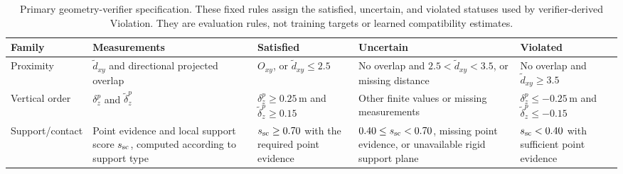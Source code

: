 \begin{table}[t]
\centering
{\small
\setlength{\tabcolsep}{3pt}
\begin{tabularx}{\textwidth}{@{}p{}p{}XXX@{}}
\toprule
Family & Measurements & Satisfied & Uncertain & Violated \\
\midrule
Proximity &
\(\widetilde d_{xy}\) and directional projected overlap &
\(O_{xy}\), or \(\widetilde d_{xy}\leq2.5\) &
No overlap and \(2.5<\widetilde d_{xy}<3.5\), or missing distance &
No overlap and \(\widetilde d_{xy}\geq3.5\) \\
\addlinespace
Vertical order &
\(\delta_z^p\) and \(\widetilde\delta_z^p\) &
\(\delta_z^p\geq0.25\,\mathrm m\) and
\(\widetilde\delta_z^p\geq0.15\) &
Other finite values or missing measurements &
\(\delta_z^p\leq-0.25\,\mathrm m\) and
\(\widetilde\delta_z^p\leq-0.15\) \\
\addlinespace
Support/\allowbreak contact &
Point evidence and local support score \(s_{\rm sc}\), computed according to support type &
\(s_{\rm sc}\geq0.70\) with the required point evidence &
\(0.40\leq s_{\rm sc}<0.70\), missing point evidence, or unavailable rigid support plane &
\(s_{\rm sc}<0.40\) with sufficient point evidence \\
\bottomrule
\end{tabularx}
}
\caption{Primary geometry-verifier specification. These fixed rules assign the satisfied, uncertain, and violated statuses used by verifier-derived Violation. They are evaluation rules, not training targets or learned
compatibility estimates.}
\label{tab:primary-verifier}
\end{table}


